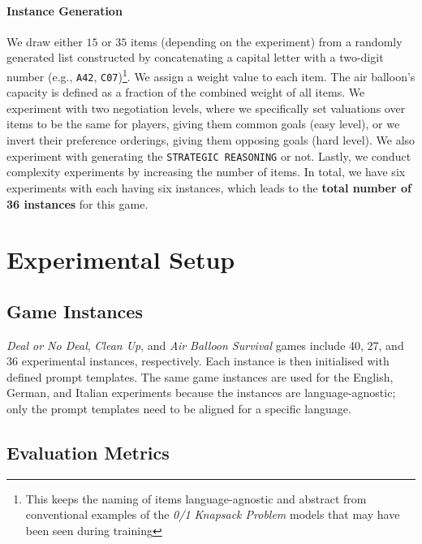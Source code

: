\documentclass[11pt]{article}
\begin{document}
\paragraph{Instance Generation}

We draw either $15$ or $35$ items (depending on the experiment) from a randomly generated list constructed by concatenating a capital letter with a two-digit number (e.g., \texttt{A42}, \texttt{C07})\footnote{This keeps the naming of items language-agnostic and abstract from conventional examples of the \textit{0/1 Knapsack Problem} models that may have been seen during training}. We assign a weight value to each item. The air balloon's capacity is defined as a fraction of the combined weight of all items. We experiment with two negotiation levels, where we specifically set valuations over items to be the same for players, giving them common goals (easy level), or we invert their preference orderings, giving them opposing goals (hard level). We also experiment with generating the \texttt{STRATEGIC REASONING} or not. Lastly, we conduct complexity experiments by increasing the number of items. In total, we have six experiments with each having six instances, which leads to the \textbf{total number of 36 instances} for this game.



\section{Experimental Setup}\label{sec:experimental_setup}

\subsection{Game Instances}

\textit{Deal or No Deal}, \textit{Clean Up}, and \textit{Air Balloon Survival} games include 40, 27, and 36 experimental instances, respectively. Each instance is then initialised with defined prompt templates. The same game instances are used for the English, German, and Italian experiments because the instances are language-agnostic; only the prompt templates need to be aligned for a specific language. 



\subsection{Evaluation Metrics}
\end{document}

